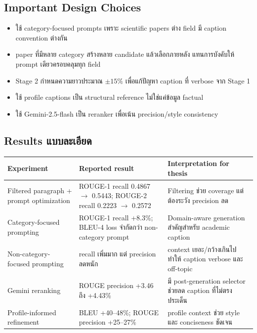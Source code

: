 \documentclass[10pt,a4paper]{article}
\begin{document}
\subsection{Important Design Choices}
\begin{itemize}
\item ใช้ category-focused prompts เพราะ scientific papers ต่าง field มี caption convention ต่างกัน
\item paper ที่มีหลาย category สร้างหลาย candidate แล้วเลือกภายหลัง แทนการบังคับให้ prompt เดียวครอบคลุมทุก field
\item Stage 2 กำหนดความยาวประมาณ \(\pm 15\%\) เพื่อแก้ปัญหา caption ที่ verbose จาก Stage 1
\item ใช้ profile captions เป็น structural reference ไม่ใช่แค่ข้อมูล factual
\item ใช้ Gemini-2.5-flash เป็น reranker เพื่อเน้น precision/style consistency
\end{itemize}

\subsection{Results แบบละเอียด}
\begin{longtable}{@{}L{4.1cm}L{4.3cm}L{6.2cm}@{}}
\toprule
\textbf{Experiment} & \textbf{Reported result} & \textbf{Interpretation for thesis} \\
\midrule
Filtered paragraph + prompt optimization & ROUGE-1 recall 0.4867 \(\rightarrow\) 0.5443; ROUGE-2 recall 0.2223 \(\rightarrow\) 0.2572 & Filtering ช่วย coverage แต่ต้องระวัง precision ลด \\
Category-focused prompting & ROUGE-1 recall +8.3\%; BLEU-4 loss จำกัดกว่า non-category prompt & Domain-aware generation สำคัญสำหรับ academic caption \\
Non-category-focused prompting & recall เพิ่มมาก แต่ precision ลดหนัก & context เยอะ/กว้างเกินไปทำให้ caption verbose และ off-topic \\
Gemini reranking & ROUGE precision +3.46 ถึง +4.43\% & มี post-generation selector ช่วยลด caption ที่ไม่ตรงประเด็น \\
Profile-informed refinement & BLEU +40--48\%; ROUGE precision +25--27\% & profile context ช่วย style และ conciseness ชัดเจน \\
\bottomrule
\end{longtable}
\end{document}
